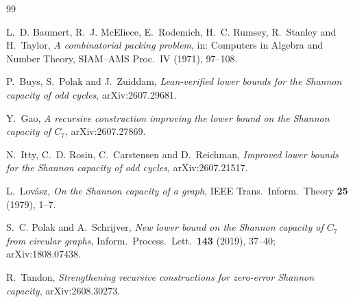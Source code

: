 \documentclass[11pt,a4paper]{article}
\begin{document}
\begin{thebibliography}{99}

L.~D. Baumert, R.~J. McEliece, E.~Rodemich, H.~C. Rumsey, R.~Stanley and H.~Taylor,
\emph{A combinatorial packing problem},
in: Computers in Algebra and Number Theory, SIAM--AMS Proc.~IV (1971), 97--108.

P.~Buys, S.~Polak and J.~Zuiddam,
\emph{Lean-verified lower bounds for the Shannon capacity of odd cycles},
arXiv:2607.29681.

Y.~Gao,
\emph{A recursive construction improving the lower bound on the Shannon capacity of $C_7$},
arXiv:2607.27869.

N.~Itty, C.~D. Rosin, C.~Carstensen and D.~Reichman,
\emph{Improved lower bounds for the Shannon capacity of odd cycles},
arXiv:2607.21517.

L.~Lov\'asz, \emph{On the Shannon capacity of a graph},
IEEE Trans.\ Inform.\ Theory \textbf{25} (1979), 1--7.

S.~C. Polak and A.~Schrijver,
\emph{New lower bound on the Shannon capacity of $C_7$ from circular graphs},
Inform.\ Process.\ Lett.\ \textbf{143} (2019), 37--40; arXiv:1808.07438.

R.~Tandon,
\emph{Strengthening recursive constructions for zero-error Shannon capacity},
arXiv:2608.30273.

\end{thebibliography}
\end{document}

